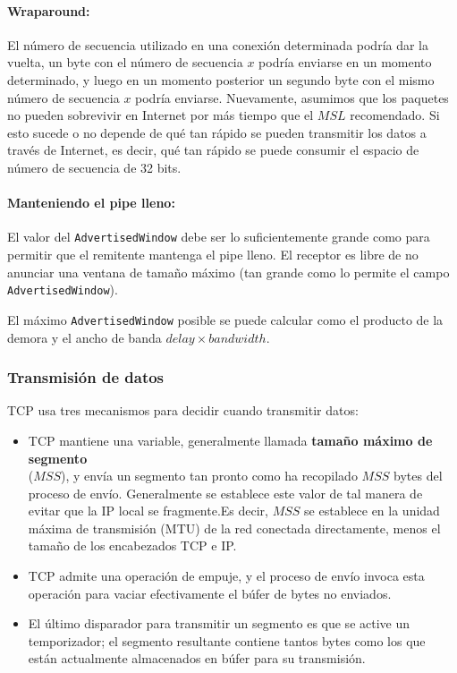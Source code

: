 \paragraph{Wraparound:} El número de secuencia utilizado en una conexión determinada podría dar la vuelta, un byte con el número de secuencia \(x\) podría enviarse en un momento determinado, y luego en un momento posterior un segundo byte con el mismo número de secuencia \(x\) podría enviarse. Nuevamente, asumimos que los paquetes no pueden sobrevivir en Internet por más tiempo que el \(MSL\) recomendado. Si esto sucede o no depende de qué tan rápido se pueden transmitir los datos a través de Internet, es decir, qué tan rápido se puede consumir el espacio de número de secuencia de 32 bits.

\paragraph{Manteniendo el pipe lleno:} El valor del \texttt{AdvertisedWindow} debe ser lo suficientemente grande como para permitir que el remitente mantenga el pipe lleno. El receptor es libre de no anunciar una ventana de tamaño máximo (tan grande como lo permite el campo \texttt{AdvertisedWindow}).

El máximo \texttt{AdvertisedWindow} posible se puede calcular como el  producto de la demora y el ancho de banda \(delay\times bandwidth\).

\subsubsection{Transmisión de datos}
TCP usa tres mecanismos para decidir cuando transmitir datos:
\begin{itemize}
  \item TCP mantiene una variable, generalmente llamada \textbf{tamaño máximo de segmento}\\ (\(MSS\)), y envía un segmento tan pronto como ha recopilado \(MSS\) bytes del proceso de envío. 
  Generalmente se establece este valor de tal manera de evitar que la IP local se fragmente.Es decir, \(MSS\) se establece en la unidad máxima de transmisión (MTU) de la red conectada directamente, menos el tamaño de los encabezados TCP e IP.
  \item TCP admite una operación de empuje, y el proceso de envío invoca esta operación para vaciar efectivamente el búfer de bytes no enviados.
  \item El último disparador para transmitir un segmento es que se active un temporizador; el segmento resultante contiene tantos bytes como los que están actualmente almacenados en búfer para su transmisión.
\end{itemize}

